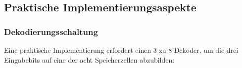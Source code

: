 \documentclass[12pt, a4paper]{article}
\theoremstyle{definition}
\theoremstyle{remark}
\begin{document}
\subsection{Praktische Implementierungsaspekte}
\label{subsec:praktische_implementierung}

\subsubsection{Dekodierungsschaltung}

Eine praktische Implementierung erfordert einen 3-zu-8-Dekoder, um die drei Eingabebits auf eine der acht Speicherzellen abzubilden:

  
  
  
  
  
  
  
  
\end{document}
